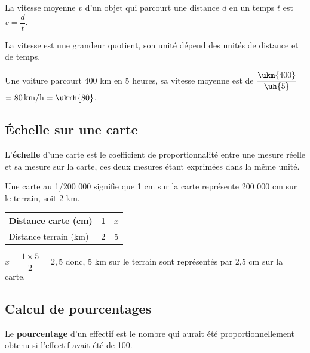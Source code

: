 \begin{propriete}
   La vitesse moyenne $v$ d'un objet qui parcourt une distance $d$ en un temps $t$ est $v=\dfrac{d}{t}$.
\end{propriete}

\medskip

La vitesse est une grandeur quotient, son unité dépend des unités de distance et de temps.

\begin{exemple*1}
   Une voiture parcourt 400 km en 5 heures, sa vitesse moyenne est de $\dfrac{\ukm{400}}{\uh{5}}$ \\
   $=80\,\mathrm{km/h} =\ukmh{80}$.
\end{exemple*1}


\subsection{Échelle sur une carte} %

\begin{definition}[Échelle]
   L'\textbf{échelle} d'une carte est le coefficient de proportionnalité entre une mesure réelle et sa mesure sur la carte, ces deux mesures étant exprimées dans la même unité.
\end{definition}

\bigskip

   Une carte au 1/200 000 signifie que 1 cm sur la carte représente 200 000 cm sur le terrain, soit 2 km. \smallskip
   
   \begin{tabular}{|l|c|c|}
      \hline
       Distance carte (cm) & 1 & $x$ \\
      \hline
      Distance terrain (km) & 2 & 5 \\
      \hline
   \end{tabular}
   \; $x=\dfrac{1\times5}{2}= 2,5$ donc, 5 km sur le terrain sont représentés par 2,5 cm sur la carte.

\bigskip

\subsection{Calcul de pourcentages} %

\begin{definition}[Pourcentage]
   Le {\bf pourcentage} d'un effectif est le nombre qui aurait été proportionnellement obtenu si l'effectif avait été de 100.
\end{definition}

